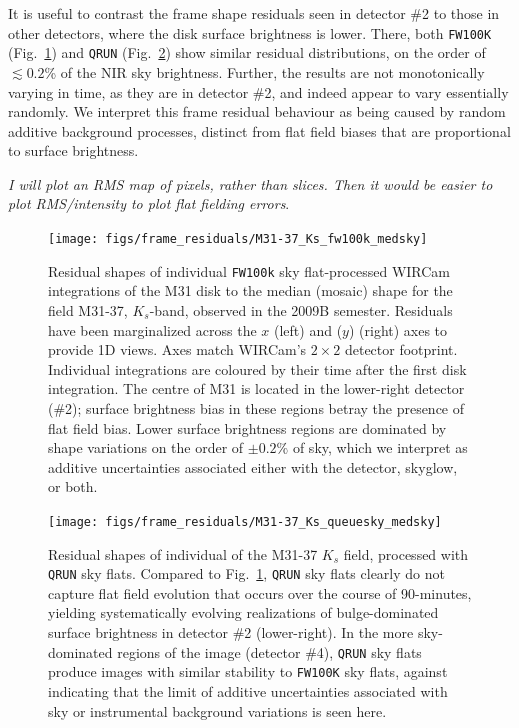 \documentclass[iop]{emulateapj}
\newcommand{\mycomment}[1]{\textcolor{OliveGreen}{\textit{#1}}} %
\newcommand{\Fig}[1]{Fig.~\ref{fig:#1}}  %
\begin{document}
It is useful to contrast the frame shape residuals seen in detector \#2 to those in other detectors, where the disk surface brightness is lower.
There, both \texttt{FW100K} (\Fig{frame_residuals_M31-37_Ks_fw100k_medsky}) and \texttt{QRUN} (\Fig{frame_residuals_M31-37_Ks_QRUN}) show similar residual distributions, on the order of $\lesssim 0.2$\% of the NIR sky brightness.
Further, the results are not monotonically varying in time, as they are in detector \#2, and indeed appear to vary essentially randomly.
We interpret this frame residual behaviour as being caused by random additive background processes, distinct from flat field biases that are proportional to surface brightness.

\mycomment{I will plot an RMS map of pixels, rather than slices. Then it would be easier to plot RMS/intensity to plot flat fielding errors}.

\begin{figure}[p]
\centering
\texttt{[image: figs/frame\_residuals/M31-37\_Ks\_fw100k\_medsky]}
\caption{Residual shapes of individual \texttt{FW100k} sky flat-processed WIRCam integrations of the M31 disk to the median (mosaic) shape for the field M31-37, $K_s$-band, observed in the 2009B semester.
Residuals have been marginalized across the $x$ (left) and ($y$) (right) axes to provide 1D views.
Axes match WIRCam's $2\times2$ detector footprint.
Individual integrations are coloured by their time after the first disk integration.
The centre of M31 is located in the lower-right detector (\#2); surface brightness bias in these regions betray the presence of flat field bias. Lower surface brightness regions are dominated by shape variations on the order of $\pm 0.2\%$ of sky, which we interpret as additive uncertainties associated either with the detector, skyglow, or both.}
\label{fig:frame_residuals_M31-37_Ks_fw100k_medsky}
\end{figure}


\begin{figure}[p]
\centering
\texttt{[image: figs/frame\_residuals/M31-37\_Ks\_queuesky\_medsky]}
\caption{Residual shapes of individual of the M31-37 $K_s$ field, processed with \texttt{QRUN} sky flats.
Compared to \Fig{frame_residuals_M31-37_Ks_fw100k_medsky}, \texttt{QRUN} sky flats clearly do not capture flat field evolution that occurs over the course of 90-minutes, yielding systematically evolving realizations of bulge-dominated surface brightness in detector \#2 (lower-right). In the more sky-dominated regions of the image (detector \#4), \texttt{QRUN} sky flats produce images with similar stability to \texttt{FW100K} sky flats, against indicating that the limit of additive uncertainties associated with sky or instrumental background variations is seen here.}
\label{fig:frame_residuals_M31-37_Ks_QRUN}
\end{figure}
\end{document}
